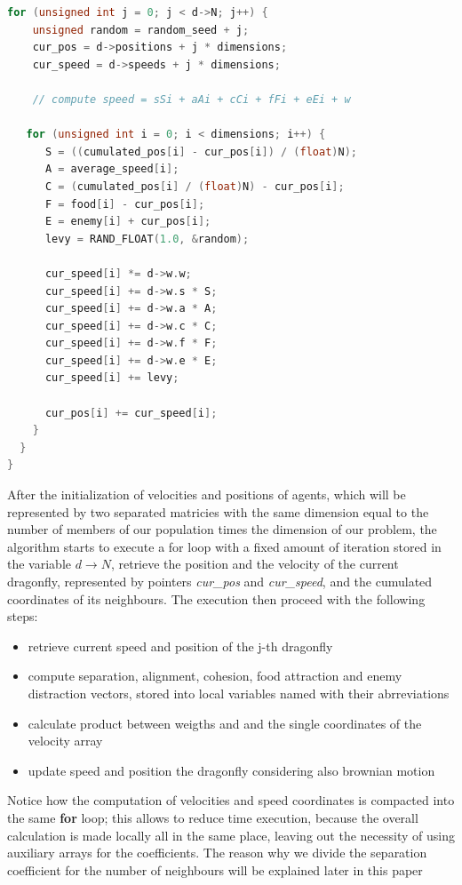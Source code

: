 \documentclass[10pt]{article}
\begin{document}
\begin{multicols}{2}
\begin{lstlisting}[language=C,caption={first implementation of the dragonfly algorithm}]
  for (unsigned int j = 0; j < d->N; j++) {
    unsigned random = random_seed + j;
    cur_pos = d->positions + j * dimensions;
    cur_speed = d->speeds + j * dimensions;

    // compute speed = sSi + aAi + cCi + fFi + eEi + w

   for (unsigned int i = 0; i < dimensions; i++) {
      S = ((cumulated_pos[i] - cur_pos[i]) / (float)N);
      A = average_speed[i];
      C = (cumulated_pos[i] / (float)N) - cur_pos[i];
      F = food[i] - cur_pos[i];
      E = enemy[i] + cur_pos[i];
      levy = RAND_FLOAT(1.0, &random);

      cur_speed[i] *= d->w.w;
      cur_speed[i] += d->w.s * S;
      cur_speed[i] += d->w.a * A;
      cur_speed[i] += d->w.c * C;
      cur_speed[i] += d->w.f * F;
      cur_speed[i] += d->w.e * E;
      cur_speed[i] += levy;

      cur_pos[i] += cur_speed[i];
    }
  }
}
\end{lstlisting}

\noindent After the initialization of velocities and positions of agents,
which will be represented by two separated matricies with the same dimension equal to the number of members of our
population times the dimension of our problem, the algorithm starts to execute a for loop 
with a fixed amount of iteration stored in the variable $d\rightarrow N$,  retrieve
the position and the velocity of the current dragonfly, represented by pointers
\textit{cur\_pos} and \textit{cur\_speed},
and the cumulated coordinates of its neighbours. 
The execution then proceed with the following steps:

\begin{itemize}
  \item retrieve current speed and position of the j-th dragonfly
  \item compute separation, alignment, cohesion, food attraction and enemy distraction vectors,
  stored into local variables named with their abrreviations
  \item calculate product between weigths and and the single coordinates of the velocity array
  \item update speed and position the dragonfly considering also brownian motion
\end{itemize}

\noindent Notice how the computation
of velocities and speed coordinates is compacted into the same \textbf{for} loop;
this allows to reduce time execution, because the overall calculation is made locally
all in the same place, leaving out the necessity of using auxiliary arrays for the coefficients.
The reason why we divide the separation coefficient for the number of neighbours 
will be explained later in this paper


\end{multicols}
\end{document}
